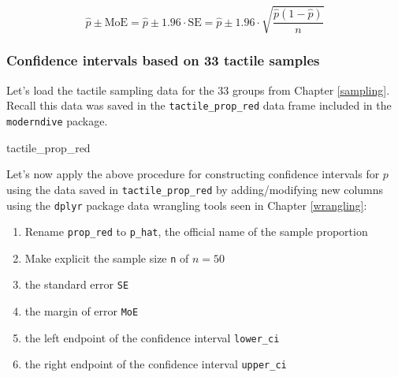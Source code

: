 \documentclass[12pt,]{krantz}
\makeatletter
\newenvironment{Shaded}{\begin{snugshade}}{\end{snugshade}}
\newcommand{\KeywordTok}[1]{\textcolor[rgb]{0.27,0.27,0.27}{\textbf{#1}}}
\newcommand{\DataTypeTok}[1]{\textcolor[rgb]{0.27,0.27,0.27}{#1}}
\newcommand{\DecValTok}[1]{\textcolor[rgb]{0.06,0.06,0.06}{#1}}
\newcommand{\FloatTok}[1]{\textcolor[rgb]{0.06,0.06,0.06}{#1}}
\newcommand{\StringTok}[1]{\textcolor[rgb]{0.5,0.5,0.5}{#1}}
\newcommand{\OperatorTok}[1]{\textcolor[rgb]{0.43,0.43,0.43}{\textbf{#1}}}
\newcommand{\NormalTok}[1]{#1}
\providecommand{\tightlist}{%
  \setlength{\itemsep}{0pt}\setlength{\parskip}{0pt}}
\newenvironment{kframe}{%
\medskip{}
\setlength{\fboxsep}{.8em}
 \def\at@end@of@kframe{}%
 \ifinner\ifhmode%
  \def\at@end@of@kframe{\end{minipage}}%
  \begin{minipage}{\columnwidth}%
 \fi\fi%
 \def\FrameCommand##1{\hskip\@totalleftmargin \hskip-\fboxsep
 \colorbox{shadecolor}{##1}\hskip-\fboxsep
     \hskip-\linewidth \hskip-\@totalleftmargin \hskip\columnwidth}%
 \MakeFramed {\advance\hsize-\width
   \@totalleftmargin\z@ \linewidth\hsize
   \@setminipage}}%
 {\par\unskip\endMakeFramed%
 \at@end@of@kframe}
\renewenvironment{Shaded}{\begin{kframe}}{\end{kframe}}
\makeatother
\begin{document}
\[
\widehat{p} \pm \text{MoE} = \widehat{p} \pm 1.96 \cdot \text{SE} = \widehat{p} \pm 1.96 \cdot \sqrt{\frac{\widehat{p}(1-\widehat{p})}{n}}
\]

\subsubsection*{Confidence intervals based on 33 tactile
samples}\label{confidence-intervals-based-on-33-tactile-samples}

Let's load the tactile sampling data for the 33 groups from Chapter
\ref{sampling}. Recall this data was saved in the
\texttt{tactile\_prop\_red} data frame included in the
\texttt{moderndive} package.

\begin{Shaded}
\begin{Highlighting}[]
\NormalTok{tactile_prop_red}
\end{Highlighting}
\end{Shaded}

Let's now apply the above procedure for constructing confidence
intervals for \(p\) using the data saved in \texttt{tactile\_prop\_red}
by adding/modifying new columns using the \texttt{dplyr} package data
wrangling tools seen in Chapter \ref{wrangling}:

\begin{enumerate}
\def\labelenumi{\arabic{enumi}.}
\tightlist
\item
  Rename \texttt{prop\_red} to \texttt{p\_hat}, the official name of the
  sample proportion
\item
  Make explicit the sample size \texttt{n} of \(n=50\)
\item
  the standard error \texttt{SE}
\item
  the margin of error \texttt{MoE}
\item
  the left endpoint of the confidence interval \texttt{lower\_ci}
\item
  the right endpoint of the confidence interval \texttt{upper\_ci}
\end{enumerate}

\begin{Shaded}
\end{Shaded}
\end{document}
